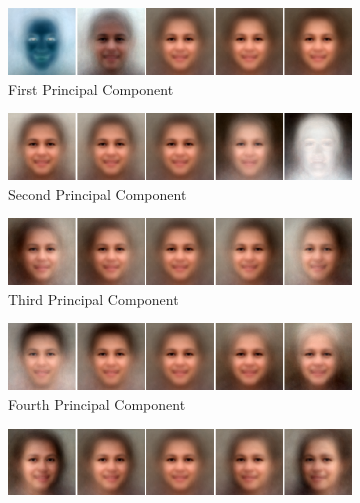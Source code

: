 \begin{figure}
    \centering
    \begin{subfigure}[b]{\textwidth}
        \includegraphics[width=\textwidth]{fig/PCA/pca0}
        \caption{First Principal Component}
    \end{subfigure}
    \begin{subfigure}[b]{\textwidth}
        \includegraphics[width=\textwidth]{fig/PCA/pca1}
        \caption{Second Principal Component}
    \end{subfigure}
    \begin{subfigure}[b]{\textwidth}
        \includegraphics[width=\textwidth]{fig/PCA/pca2}
        \caption{Third Principal Component}
    \end{subfigure}
    \begin{subfigure}[b]{\textwidth}
        \includegraphics[width=\textwidth]{fig/PCA/pca3}
        \caption{Fourth Principal Component}
    \end{subfigure}
    \begin{subfigure}[b]{\textwidth}
        \includegraphics[width=\textwidth]{fig/PCA/pca4}

\end{subfigure}
\end{figure}
